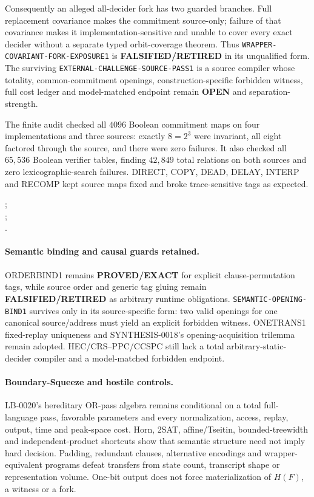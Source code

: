 \documentclass[11pt]{article}
\begin{document}
Consequently an alleged all-decider fork has two guarded branches.  Full
replacement covariance makes the commitment source-only; failure of that
covariance makes it implementation-sensitive and unable to cover every exact
decider without a separate typed orbit-coverage theorem.  Thus
\texttt{WRAPPER-COVARIANT-FORK-EXPOSURE1} is
\textbf{FALSIFIED/RETIRED} in its unqualified form.  The surviving
\texttt{EXTERNAL-CHALLENGE-SOURCE-PASS1} is a source compiler whose totality,
common-commitment openings, construction-specific forbidden witness, full
cost ledger and model-matched endpoint remain \textbf{OPEN} and
separation-strength.

The finite audit checked all \(4096\) Boolean commitment maps on four
implementations and three sources: exactly \(8=2^3\) were invariant, all
eight factored through the source, and there were zero failures.  It also
checked all \(65{,}536\) Boolean verifier tables, finding \(42{,}849\) total
relations on both sources and zero lexicographic-search failures.  DIRECT,
COPY, DEAD, DELAY, INTERP and RECOMP kept source maps fixed and broke
trace-sensitive tags as expected.

;\\
;\\
.

\paragraph{Semantic binding and causal guards retained.}
ORDERBIND1 remains \textbf{PROVED/EXACT} for explicit clause-permutation
tags, while source order and generic tag gluing remain
\textbf{FALSIFIED/RETIRED} as arbitrary runtime obligations.
\texttt{SEMANTIC-OPENING-BIND1} survives only in its source-specific form:
two valid openings for one canonical source/address must yield an explicit
forbidden witness.  ONETRANS1 fixed-replay uniqueness and SYNTHESIS-0018's
opening-acquisition trilemma remain adopted.  HEC/CRS--PPC/CCSPC still lack a
total arbitrary-static-decider compiler and a model-matched forbidden
endpoint.

\paragraph{Boundary-Squeeze and hostile controls.}
LB-0020's hereditary OR-pass algebra remains conditional on a total
full-language pass, favorable parameters and every normalization, access,
replay, output, time and peak-space cost.  Horn, 2SAT, affine/Tseitin,
bounded-treewidth and independent-product shortcuts show that semantic
structure need not imply hard decision.  Padding, redundant clauses,
alternative encodings and wrapper-equivalent programs defeat transfers from
state count, transcript shape or representation volume.  One-bit output does
not force materialization of \(H(F)\), a witness or a fork.
\end{document}
